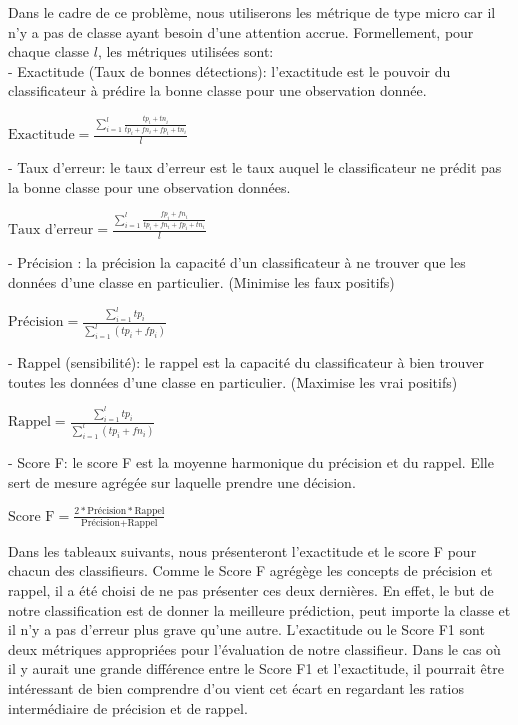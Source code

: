 Dans le cadre de ce problème, nous utiliserons les métrique de type micro car il n'y a pas de classe ayant besoin d'une attention accrue. Formellement, pour chaque classe $l$, les métriques utilisées sont: \\

- Exactitude (Taux de bonnes détections): l'exactitude est le pouvoir du classificateur à prédire la bonne classe pour une observation donnée.\\
\begin{center}
	$\textrm{Exactitude} = \frac{\sum_{i=1}^{l} \frac{tp_i +tn_i}{tp_i + fn_i + fp_i+ tn_i}}{l}$
\end{center}
	
- Taux d'erreur: le taux d'erreur est le taux auquel le classificateur ne prédit pas la bonne classe pour une observation données.\\ 
\begin{center}
	$\textrm{Taux d'erreur} = \frac{\sum_{i=1}^{l} \frac{fp_i +fn_i}{tp_i + fn_i + fp_i+ tn_i}}{l}$
\end{center}

- Précision : la précision la capacité d'un classificateur à ne trouver que les données d'une classe en particulier. (Minimise les faux positifs) \\
\begin{center}
	$\textrm{Précision} = \frac{\sum_{i=1}^{l} tp_i}{\sum_{i=1}^{l} (tp_i + fp_i)}$
\end{center}

- Rappel (sensibilité): le rappel est la capacité du classificateur à bien trouver toutes les données d'une classe en particulier. (Maximise les vrai positifs)\\
\begin{center}
	$\textrm{Rappel} = \frac{\sum_{i=1}^{l} tp_i}{\sum_{i=1}^{l} (tp_i + fn_i)}$
\end{center}

- Score F: le score F est la moyenne harmonique du précision et du rappel. Elle sert de mesure agrégée sur laquelle prendre une décision.\\
\begin{center}
	$\textrm{Score F} = \frac{2 * \textrm{Précision} * \textrm{Rappel}}{\textrm{Précision} + \textrm{Rappel}}$
\end{center}

Dans les tableaux suivants, nous présenteront l'exactitude et le score F pour chacun des classifieurs. Comme le Score F agrégège les concepts de précision et rappel, il a été choisi de ne pas présenter ces deux dernières. En effet, le but de notre classification est de donner la meilleure prédiction, peut importe la classe et il n'y a pas d'erreur plus grave qu'une autre. L'exactitude ou le Score F1 sont deux métriques appropriées pour l'évaluation de notre classifieur. Dans le cas où il y aurait une grande différence entre le Score F1 et l'exactitude, il pourrait être intéressant de bien comprendre d'ou vient cet écart en regardant les ratios intermédiaire de précision et de rappel.

